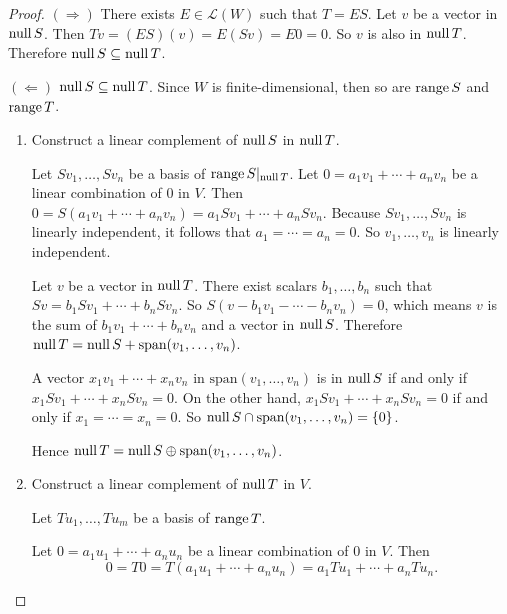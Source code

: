 \begin{proof}
    $(\Rightarrow)$ There exists $E\in\mathcal{L}(W)$ such that $T = ES$. Let $v$ be a vector in $\text{null}\,{S}$. Then $Tv = (ES)(v) = E(Sv) = E0 = 0$. So $v$ is also in $\text{null}\,{T}$. Therefore $\text{null}\,{S}\subseteq\text{null}\,{T}$.

    $(\Leftarrow)$ $\text{null}\,{S}\subseteq\text{null}\,{T}$. Since $W$ is finite-dimensional, then so are $\text{range}\,{S}$ and $\text{range}\,{T}$.

    \begin{enumerate}[label={\textbf{Step \arabic*.}},itemindent={1cm}]
        \item Construct a linear complement of $\text{null}\,{S}$ in $\text{null}\,{T}$.

              Let $Sv_{1}, \ldots, Sv_{n}$ be a basis of $\text{range}\,{S}\vert_{\text{null}\,{T}}$. Let $0 = a_{1}v_{1} + \cdots + a_{n}v_{n}$ be a linear combination of $0$ in $V$. Then $0 = S(a_{1}v_{1} + \cdots + a_{n}v_{n}) = a_{1}Sv_{1} + \cdots + a_{n}Sv_{n}$. Because $Sv_{1}, \ldots, Sv_{n}$ is linearly independent, it follows that $a_{1} = \cdots = a_{n} = 0$. So $v_{1}, \ldots, v_{n}$ is linearly independent.

              Let $v$ be a vector in $\text{null}\,{T}$. There exist scalars $b_{1}, \ldots, b_{n}$ such that $Sv = b_{1}Sv_{1} + \cdots + b_{n}Sv_{n}$. So $S(v - b_{1}v_{1} - \cdots - b_{n}v_{n}) = 0$, which means $v$ is the sum of $b_{1}v_{1} + \cdots + b_{n}v_{n}$ and a vector in $\text{null}\,{S}$. Therefore $\text{null}\,{T} = \text{null}\,{S} + \text{span}(v_{1}, \ldots, v_{n})$.

              A vector $x_{1}v_{1} + \cdots + x_{n}v_{n}$ in $\text{span}(v_{1}, \ldots, v_{n})$ is in $\text{null}\,{S}$ if and only if $x_{1}Sv_{1} + \cdots + x_{n}Sv_{n} = 0$. On the other hand, $x_{1}Sv_{1} + \cdots + x_{n}Sv_{n} = 0$ if and only if $x_{1} = \cdots = x_{n} = 0$. So $\text{null}\,{S}\cap \text{span}(v_{1}, \ldots, v_{n}) = \{0\}$.

              Hence $\text{null}\,{T} = \text{null}\,{S}\oplus\text{span}(v_{1}, \ldots, v_{n})$.
        \item Construct a linear complement of $\text{null}\,{T}$ in $V$.

              Let $Tu_{1}, \ldots, Tu_{m}$ be a basis of $\text{range}\,{T}$.

              Let $0 = a_{1}u_{1} + \cdots + a_{n}u_{n}$ be a linear combination of $0$ in $V$. Then
              \[
                  0 = T0 = T(a_{1}u_{1} + \cdots + a_{n}u_{n}) = a_{1}Tu_{1} + \cdots + a_{n}Tu_{n}.
              \]


\end{enumerate}
\end{proof}
